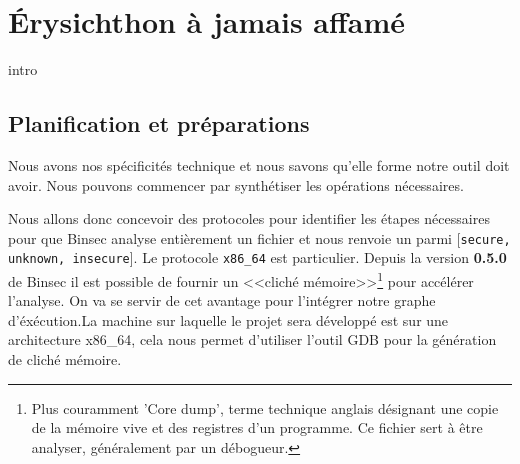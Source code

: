 \chapter{Érysichthon à jamais affamé}
\label{chap:erysichtonUsage}

intro


\section{Planification et préparations}

Nous avons nos spécificités technique et nous savons qu'elle forme notre outil doit avoir. Nous pouvons commencer par synthétiser les opérations nécessaires.\smallbreak

Nous allons donc concevoir des protocoles pour identifier les étapes nécessaires pour que Binsec analyse entièrement un fichier et nous renvoie un parmi [\texttt{secure, unknown, insecure}]. Le protocole \texttt{x86\_64} est particulier. Depuis la version \textbf{0.5.0} de Binsec il est possible de fournir un <<cliché mémoire>>\footnote{Plus couramment 'Core dump', terme technique anglais désignant une copie de la mémoire vive et des registres d'un programme. Ce fichier sert à être analyser, généralement par un débogueur.} pour accélérer l'analyse. On va se servir de cet avantage pour l'intégrer notre graphe d'éxécution.La machine sur laquelle le projet sera développé est sur une architecture x86\_64, cela nous permet d'utiliser l'outil GDB pour la génération de cliché mémoire.\medbreak

